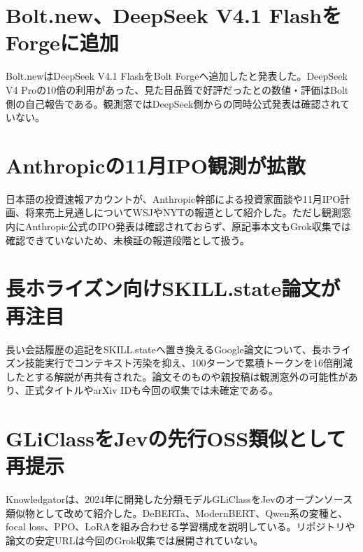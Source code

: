 \section{Bolt.new、DeepSeek V4.1 FlashをForgeに追加}
Bolt.newはDeepSeek V4.1 FlashをBolt Forgeへ追加したと発表した。DeepSeek V4 Proの10倍の利用があった、見た目品質で好評だったとの数値・評価はBolt側の自己報告である。観測窓ではDeepSeek側からの同時公式発表は確認されていない。

\section{Anthropicの11月IPO観測が拡散}
日本語の投資速報アカウントが、Anthropic幹部による投資家面談や11月IPO計画、将来売上見通しについてWSJやNYTの報道として紹介した。ただし観測窓内にAnthropic公式のIPO発表は確認されておらず、原記事本文もGrok収集では確認できていないため、未検証の報道段階として扱う。

\section{長ホライズン向けSKILL.state論文が再注目}
長い会話履歴の追記をSKILL.stateへ置き換えるGoogle論文について、長ホライズン技能実行でコンテキスト汚染を抑え、100ターンで累積トークンを16倍削減したとする解説が再共有された。論文そのものや親投稿は観測窓外の可能性があり、正式タイトルやarXiv IDも今回の収集では未確定である。

\section{GLiClassをJevの先行OSS類似として再提示}
Knowledgatorは、2024年に開発した分類モデルGLiClassをJevのオープンソース類似物として改めて紹介した。DeBERTa、ModernBERT、Qwen系の変種と、focal loss、PPO、LoRAを組み合わせる学習構成を説明している。リポジトリや論文の安定URLは今回のGrok収集では展開されていない。
